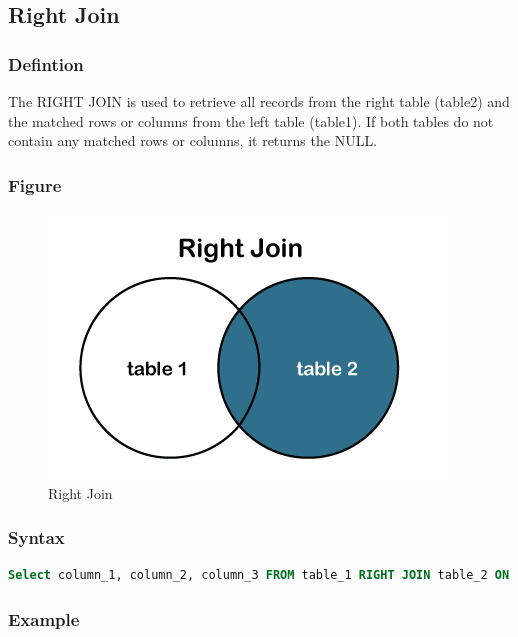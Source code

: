 \documentclass[11pt]{article}
\begin{document}
\subsection{Right Join}

\subsubsection*{Defintion}

The RIGHT JOIN is used to retrieve all records from the right table (table2) and the matched rows or columns from the left table (table1). If both tables do not contain any matched rows or columns, it returns the NULL.

\subsubsection*{Figure}

\begin{figure}[H]
	\centering
	\includegraphics[width=.45\textwidth]{right join.png}
	\caption{ Right Join}
\end{figure}

\subsubsection*{Syntax}

\begin{lstlisting}[language=sql]
Select column_1, column_2, column_3 FROM table_1 RIGHT JOIN table_2 ON table_1.column = table_2.column; 
\end{lstlisting}

\subsubsection*{Example}
\end{document}
